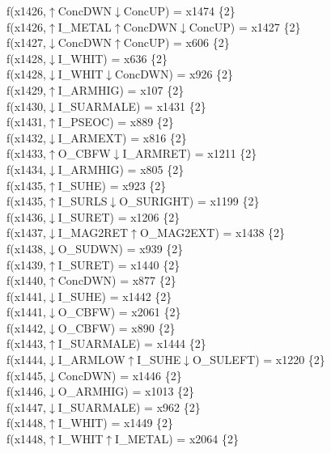 f(x1426,$\uparrow$ConcDWN$\downarrow$ConcUP) = x1474 \{2\} \\  
f(x1426,$\uparrow$I\_METAL$\uparrow$ConcDWN$\downarrow$ConcUP) = x1427 \{2\} \\  
f(x1427,$\downarrow$ConcDWN$\uparrow$ConcUP) = x606 \{2\} \\  
f(x1428,$\downarrow$I\_WHIT) = x636 \{2\} \\  
f(x1428,$\downarrow$I\_WHIT$\downarrow$ConcDWN) = x926 \{2\} \\  
f(x1429,$\uparrow$I\_ARMHIG) = x107 \{2\} \\  
f(x1430,$\downarrow$I\_SUARMALE) = x1431 \{2\} \\  
f(x1431,$\uparrow$I\_PSEOC) = x889 \{2\} \\  
f(x1432,$\downarrow$I\_ARMEXT) = x816 \{2\} \\  
f(x1433,$\uparrow$O\_CBFW$\downarrow$I\_ARMRET) = x1211 \{2\} \\  
f(x1434,$\downarrow$I\_ARMHIG) = x805 \{2\} \\  
f(x1435,$\uparrow$I\_SUHE) = x923 \{2\} \\  
f(x1435,$\uparrow$I\_SURLS$\downarrow$O\_SURIGHT) = x1199 \{2\} \\  
f(x1436,$\downarrow$I\_SURET) = x1206 \{2\} \\  
f(x1437,$\downarrow$I\_MAG2RET$\uparrow$O\_MAG2EXT) = x1438 \{2\} \\  
f(x1438,$\downarrow$O\_SUDWN) = x939 \{2\} \\  
f(x1439,$\uparrow$I\_SURET) = x1440 \{2\} \\  
f(x1440,$\uparrow$ConcDWN) = x877 \{2\} \\  
f(x1441,$\downarrow$I\_SUHE) = x1442 \{2\} \\  
f(x1441,$\downarrow$O\_CBFW) = x2061 \{2\} \\  
f(x1442,$\downarrow$O\_CBFW) = x890 \{2\} \\  
f(x1443,$\uparrow$I\_SUARMALE) = x1444 \{2\} \\  
f(x1444,$\downarrow$I\_ARMLOW$\uparrow$I\_SUHE$\downarrow$O\_SULEFT) = x1220 \{2\} \\  
f(x1445,$\downarrow$ConcDWN) = x1446 \{2\} \\  
f(x1446,$\downarrow$O\_ARMHIG) = x1013 \{2\} \\  
f(x1447,$\downarrow$I\_SUARMALE) = x962 \{2\} \\  
f(x1448,$\uparrow$I\_WHIT) = x1449 \{2\} \\  
f(x1448,$\uparrow$I\_WHIT$\uparrow$I\_METAL) = x2064 \{2\} \\  
